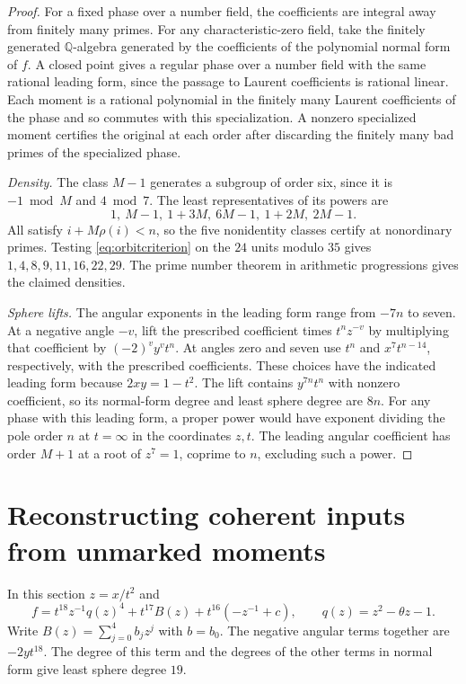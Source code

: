 \documentclass[11pt]{article}
\newcommand{\Q}{\mathbb Q}
\begin{document}
\begin{proof}
For a fixed phase over a number field, the coefficients are integral
away from finitely many primes.
For any characteristic-zero field, take the finitely generated
\(\Q\)-algebra generated by the coefficients of the polynomial normal
form of \(f\). A closed point gives a regular phase over a number field
with the same rational leading form, since the passage to Laurent
coefficients is rational linear.
Each moment is a rational polynomial in the finitely many Laurent
coefficients of the phase and so commutes with this specialization.
A nonzero specialized moment certifies the original at each order
after discarding the finitely many bad primes of the specialized phase.

\smallskip
\noindent\textit{Density.}
The class \(M-1\) generates a subgroup of order six, since it is
\(-1\bmod M\) and \(4\bmod7\). The least representatives of its
powers are
\[
          1,\ M-1,\ 1+3M,\ 6M-1,\ 1+2M,\ 2M-1.
\]
All satisfy \(i+M\rho(i)<n\), so the five nonidentity classes
certify at nonordinary primes. Testing \eqref{eq:orbitcriterion}
on the \(24\) units modulo \(35\) gives \(1,4,8,9,11,16,22,29\).
The prime number theorem in arithmetic progressions gives the
claimed densities.

\smallskip
\noindent\textit{Sphere lifts.}
The angular exponents in the leading form range from \(-7n\) to
seven. At a negative angle \(-v\), lift the prescribed coefficient
times \(t^n z^{-v}\) by multiplying that coefficient by
\((-2)^v y^v t^n\). At angles zero and seven use \(t^n\) and
\(x^7t^{n-14}\), respectively, with the prescribed coefficients.
These choices have the indicated leading form because \(2xy=1-t^2\).
The lift contains \(y^{7n}t^n\) with nonzero coefficient, so its
normal-form degree and least sphere degree are \(8n\).
For any phase with this leading form, a proper power would have
exponent dividing the pole order \(n\) at \(t=\infty\) in the
coordinates \(z,t\). The leading angular coefficient has order
\(M+1\) at a root of \(z^7=1\), coprime to \(n\), excluding such a
power.
\end{proof}

\section{Reconstructing coherent inputs from unmarked moments}
\label{sec:reconstruction}

In this section \(z=x/t^2\) and
\[
 f=t^{18}z^{-1}q(z)^4+t^{17}B(z)+t^{16}(-z^{-1}+c),
 \qquad q(z)=z^2-\theta z-1.
\]
Write \(B(z)=\sum_{j=0}^4 b_jz^j\) with \(b=b_0\).
The negative angular terms together are \(-2yt^{18}\).
The degree of this term and the degrees of the other terms in
normal form give least sphere degree \(19\).
\end{document}
